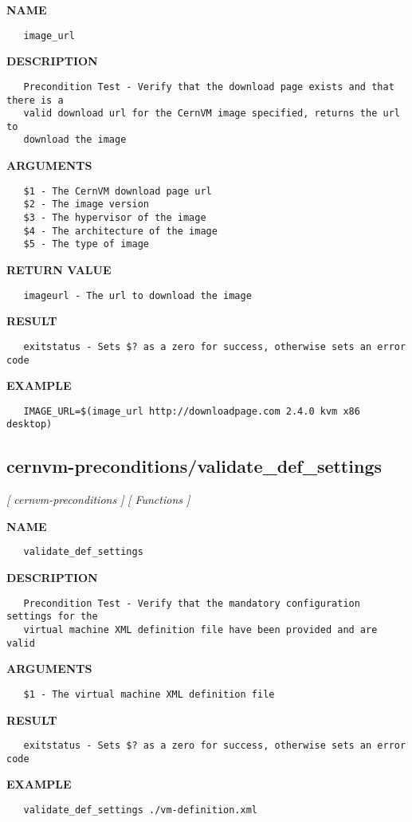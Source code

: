 \label{ch:robo5}
\label{ch:cernvm_preconditions_image_url}
\textbf{NAME}
\begin{verbatim}
   image_url
\end{verbatim}
\textbf{DESCRIPTION}
\begin{verbatim}
   Precondition Test - Verify that the download page exists and that there is a 
   valid download url for the CernVM image specified, returns the url to 
   download the image
\end{verbatim}
\textbf{ARGUMENTS}
\begin{verbatim}
   $1 - The CernVM download page url
   $2 - The image version
   $3 - The hypervisor of the image
   $4 - The architecture of the image
   $5 - The type of image
\end{verbatim}
\textbf{RETURN VALUE}
\begin{verbatim}
   imageurl - The url to download the image
\end{verbatim}
\textbf{RESULT}
\begin{verbatim}
   exitstatus - Sets $? as a zero for success, otherwise sets an error code
\end{verbatim}
\textbf{EXAMPLE}
\begin{verbatim}
   IMAGE_URL=$(image_url http://downloadpage.com 2.4.0 kvm x86 desktop)
\end{verbatim}
\newpage
\subsection{cernvm-preconditions/validate\_def\_settings}
\textsl{[ cernvm-preconditions ]}
\textsl{[ Functions ]}

\label{ch:robo6}
\label{ch:cernvm_preconditions_validate_def_settings}
\textbf{NAME}
\begin{verbatim}
   validate_def_settings
\end{verbatim}
\textbf{DESCRIPTION}
\begin{verbatim}
   Precondition Test - Verify that the mandatory configuration settings for the
   virtual machine XML definition file have been provided and are valid
\end{verbatim}
\textbf{ARGUMENTS}
\begin{verbatim}
   $1 - The virtual machine XML definition file
\end{verbatim}
\textbf{RESULT}
\begin{verbatim}
   exitstatus - Sets $? as a zero for success, otherwise sets an error code
\end{verbatim}
\textbf{EXAMPLE}
\begin{verbatim}
   validate_def_settings ./vm-definition.xml
\end{verbatim}
\newpage
